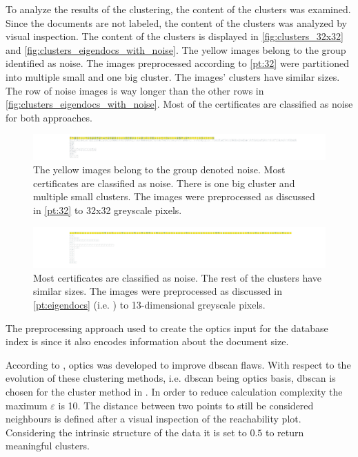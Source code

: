 To analyze the results of the clustering, the content of the clusters was examined.
Since the documents are not labeled, the content of the clusters was analyzed by visual inspection.
The content of the clusters is displayed in \autoref{fig:clusters_32x32} and \autoref{fig:clusters_eigendocs_with_noise}.
The yellow images belong to the group identified as noise.
The images preprocessed according to \autoref{pt:32} were partitioned into multiple small and one big cluster.
The \eigendocs{} images' clusters have similar sizes. 
The row of noise images is way longer than the other rows in \autoref{fig:clusters_eigendocs_with_noise}.
Most of the certificates are classified as noise for both approaches.


\begin{figure}[htp] %
    \centering
    \includegraphics[width=1.05\textwidth]{images/OPTICS/32x32/cluster_content_32x32.pdf}
    \caption[Detailed \ac{optics} clusters using 32x32 greyscale pixels]{The yellow images belong to the group denoted noise.
    Most certificates are classified as noise.
    There is one big cluster and multiple small clusters.
    The images were preprocessed as discussed in \autoref{pt:32} to 32x32 greyscale pixels.
    }
    \label{fig:clusters_32x32}
\end{figure}

\begin{figure}[htp] %
    \centering
    \includegraphics[width=1.05\textwidth]{images/OPTICS/eigendocs/cluster_content_incl_noise_Eigendocs.pdf}
    \caption[Detailed \ac{optics} clusters using \eigendocs{}]{Most certificates are classified as noise. The rest of the clusters have similar sizes.
    The images were preprocessed as discussed in \autoref{pt:eigendocs} (i.e. \eigendocs{}) to 13-dimensional greyscale pixels.
    }
    \label{fig:clusters_eigendocs_with_noise}
\end{figure}


The preprocessing approach used to create the \ac{optics} input for the \databaseName{} database index is \eigendocs{} 
since it also encodes information about the document size. 

According to \citeauthor{OPTICS2014}, \ac{optics} was developed to improve \ac{dbscan} flaws.
With respect to the evolution of these clustering methods, i.e. \ac{dbscan} being \ac{optics} basis, 
\ac{dbscan} is chosen for the cluster method in .
In order to reduce calculation complexity the maximum $\varepsilon$ is 10.
The distance between two points to still be considered neighbours is defined after a visual inspection of the reachability plot.
Considering the intrinsic structure of the data it is set to $0.5$ to return meaningful clusters.